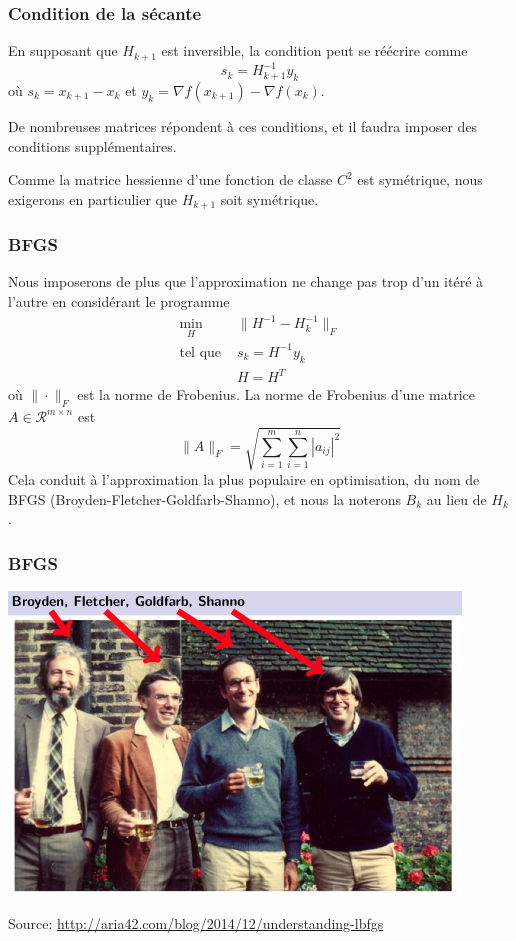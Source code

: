 \documentclass[usepdftitle=false]{beamer}
\def\cR{\mathcal{R}}
\begin{document}
\begin{frame}
\frametitle{Condition de la sécante}

En supposant que $H_{k+1}$ est inversible, la condition peut se réécrire comme
$$
s_k = H_{k+1}^{-1}y_k
$$
où $s_k = x_{k+1} - x_k$ et $y_k = \nabla f(x_{k+1}) - \nabla f(x_k)$.

\mbox{}

De nombreuses matrices répondent à ces conditions, et il faudra imposer des conditions supplémentaires.

\mbox{}

Comme la matrice hessienne d'une fonction de classe $C^2$ est symétrique, nous exigerons en particulier que $H_{k+1}$ soit symétrique.

\end{frame}

\begin{frame}
\frametitle{BFGS}

Nous imposerons de plus que l'approximation ne change pas trop d'un itéré à l'autre en considérant le programme
\begin{align*}
\min_H & \| H^{-1} - H^{-1}_k \|_F \\
\mbox{tel que } & s_k = H^{-1}y_k \\
& H = H^T
\end{align*}
où $\| \cdot \|_F$ est la norme de Frobenius.
La norme de Frobenius d'une matrice $A \in \cR^{m \times n}$ est
$$
\| A \|_F = \sqrt{\sum_{i=1}^m \sum_{i=1}^n | a_{ij} |^2 }
$$
Cela conduit à l'approximation la plus populaire en optimisation, du nom de BFGS (Broyden-Fletcher-Goldfarb-Shanno), et nous la noterons $B_k$ au lieu de $H_k$.

\end{frame}

\begin{frame}
\frametitle{BFGS}
	
\begin{center}
\includegraphics[width=0.9\textwidth]{bfgs.png}
\end{center}
{\footnotesize{Source: \url{http://aria42.com/blog/2014/12/understanding-lbfgs}}}
	
\end{frame}
\end{document}
